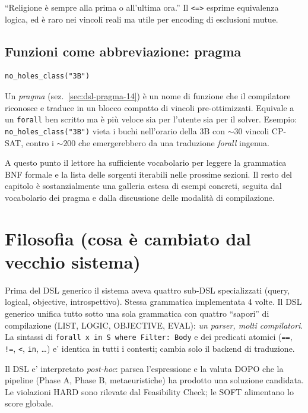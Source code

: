 ``Religione \`e sempre alla prima o all'ultima ora.'' Il
\texttt{<=>} esprime equivalenza logica, ed \`e raro nei
vincoli reali ma utile per encoding di esclusioni mutue.

\subsection{Funzioni come abbreviazione: pragma}

\begin{lstlisting}[basicstyle=\ttfamily\small]
no_holes_class("3B")
\end{lstlisting}

Un \emph{pragma} (sez.~\ref{sec:dsl-pragma-14}) \`e un nome di
funzione che il compilatore riconosce e traduce in un blocco
compatto di vincoli pre-ottimizzati. Equivale a un
\texttt{forall} ben scritto ma \`e pi\`u veloce sia per
l'utente sia per il solver. Esempio:
\texttt{no\_holes\_class("3B")} vieta i buchi nell'orario della
3B con $\sim 30$ vincoli CP-SAT, contro i $\sim 200$ che
emergerebbero da una traduzione \emph{forall} ingenua.

\fleuron

A questo punto il lettore ha sufficiente vocabolario per
leggere la grammatica BNF formale e la lista delle sorgenti
iterabili nelle prossime sezioni. Il resto del capitolo \`e
sostanzialmente una galleria estesa di esempi concreti,
seguita dal vocabolario dei pragma e dalla discussione delle
modalit\`a di compilazione.

\section{Filosofia (cosa \`e cambiato dal vecchio sistema)}

Prima del DSL generico il sistema aveva quattro sub-DSL
specializzati (query, logical, objective, introspettivo). Stessa
grammatica implementata 4 volte. Il DSL generico unifica tutto
sotto una sola grammatica con quattro ``sapori'' di compilazione
(LIST, LOGIC, OBJECTIVE, EVAL): \emph{un parser, molti
compilatori}. La sintassi di
\texttt{forall x in S where Filter: Body} e dei predicati atomici
(\texttt{==}, \texttt{!=}, \texttt{<}, \texttt{in}, \dots) e'
identica in tutti i contesti; cambia solo il backend di
traduzione.

Il DSL e' interpretato \emph{post-hoc}: parsea l'espressione e
la valuta DOPO che la pipeline (Phase A, Phase B, metaeuristiche)
ha prodotto una soluzione candidata. Le violazioni HARD sono
rilevate dal Feasibility Check; le SOFT alimentano lo score
globale.


